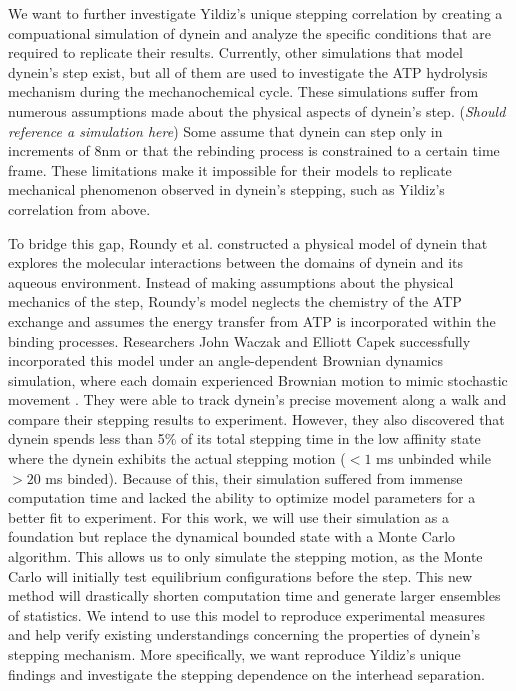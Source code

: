 We want to further investigate Yildiz's unique stepping correlation by creating a compuational simulation of dynein and analyze the specific conditions that are required to replicate their results. Currently, other simulations that model dynein's step exist, but all of them are used to investigate the ATP hydrolysis mechanism during the mechanochemical cycle. These simulations suffer from numerous assumptions made about the physical aspects of dynein's step. (\textit{Should reference a simulation here}) Some assume that dynein can step only in increments of 8nm or that the rebinding process is constrained to a certain time frame. These limitations make it impossible for their models to replicate mechanical phenomenon observed in dynein's stepping, such as Yildiz's correlation from above.

To bridge this gap, Roundy et al. constructed a physical model of dynein that explores the molecular interactions between the domains of dynein and its aqueous environment. Instead of making assumptions about the physical mechanics of the step, Roundy's model neglects the chemistry of the ATP exchange and assumes the energy transfer from ATP is incorporated within the binding processes. Researchers John Waczak and Elliott Capek successfully incorporated this model under an angle-dependent Brownian dynamics simulation, where each domain experienced Brownian motion to mimic stochastic movement \cite{Capek2017, }. They were able to track dynein's precise movement along a walk and compare their stepping results to experiment. However, they also discovered that dynein spends less than 5\% of its total stepping time in the low affinity state where the dynein exhibits the actual stepping motion ($<1$ ms unbinded while $>20$ ms binded). Because of this, their simulation suffered from immense computation time and lacked the ability to optimize model parameters for a better fit to experiment. For this work, we will use their simulation as a foundation but replace the dynamical bounded state with a Monte Carlo algorithm. This allows us to only simulate the stepping motion, as the Monte Carlo will initially test equilibrium configurations before the step. This new method will drastically shorten computation time and generate larger ensembles of statistics. We intend to use this model to reproduce experimental measures and help verify existing understandings concerning the properties of dynein’s stepping mechanism. More specifically, we want reproduce Yildiz's unique findings and investigate the stepping dependence on the interhead separation. 



